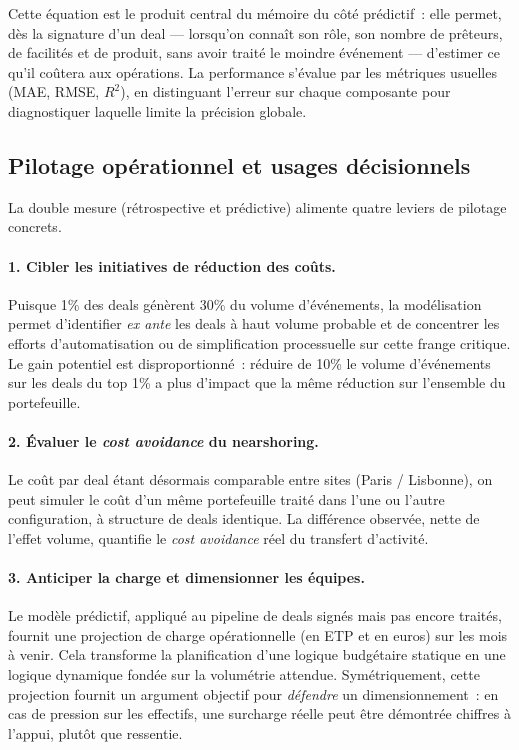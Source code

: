 Cette équation est le produit central du mémoire du côté prédictif~: elle permet, dès la signature d'un deal --- lorsqu'on connaît son rôle, son nombre de prêteurs, de facilités et de produit, sans avoir traité le moindre événement --- d'estimer ce qu'il coûtera aux opérations. La performance s'évalue par les métriques usuelles (MAE, RMSE, $R^2$), en distinguant l'erreur sur chaque composante pour diagnostiquer laquelle limite la précision globale.

\subsection{Pilotage opérationnel et usages décisionnels}
\label{sec:pilotage}

La double mesure (rétrospective et prédictive) alimente quatre leviers de pilotage concrets.

\paragraph{1. Cibler les initiatives de réduction des coûts.}
Puisque 1\% des deals génèrent 30\% du volume d'événements, la modélisation permet d'identifier \emph{ex ante} les deals à haut volume probable et de concentrer les efforts d'automatisation ou de simplification processuelle sur cette frange critique. Le gain potentiel est disproportionné~: réduire de 10\% le volume d'événements sur les deals du top 1\% a plus d'impact que la même réduction sur l'ensemble du portefeuille.

\paragraph{2. Évaluer le \textit{cost avoidance} du nearshoring.}
Le coût par deal étant désormais comparable entre sites (Paris / Lisbonne), on peut simuler le coût d'un même portefeuille traité dans l'une ou l'autre configuration, à structure de deals identique. La différence observée, nette de l'effet volume, quantifie le \textit{cost avoidance} réel du transfert d'activité.

\paragraph{3. Anticiper la charge et dimensionner les équipes.}
Le modèle prédictif, appliqué au pipeline de deals signés mais pas encore traités, fournit une projection de charge opérationnelle (en ETP et en euros) sur les mois à venir. Cela transforme la planification d'une logique budgétaire statique en une logique dynamique fondée sur la volumétrie attendue.
Symétriquement, cette projection fournit un argument objectif pour \emph{défendre}
un dimensionnement~: en cas de pression sur les effectifs, une surcharge réelle peut
être démontrée chiffres à l'appui, plutôt que ressentie.

